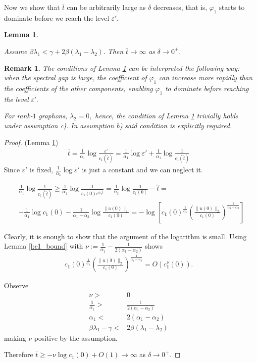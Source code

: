 \documentclass{article}
\newcommand{\1}[1]{{\mathds{1}}_{\left\{#1\right\}}}
\newtheorem{remark}{Remark}
\newtheorem{lemma}{Lemma}
\begin{document}
Now we show that $\bar{t}$ can be arbitrarily large as $\delta$ decreases, that is, $\varphi_1$ starts to dominate before we reach the level $\varepsilon'$.
\begin{lemma}
\label{l:domination_time}

Assume $\beta \lambda_1<\gamma+2\beta(\lambda_1-\lambda_2).$ Then
$ \bar{t} \to \infty $ as $\delta \to 0^{+}.$
\end{lemma}

\begin{remark}
The conditions of Lemma \ref{l:domination_time} can be interpreted the following way: when the spectral gap is large, the coefficient of $\varphi_1$ can increase more rapidly than the coefficients of the other components, enabling
 $\varphi_1$ to dominate before reaching the level $\varepsilon'$.

For rank-$1$ graphons, $\lambda_2=0,$ hence, the condition of Lemma \ref{l:domination_time} trivially holds under assumption c). In assumption b) said condition is explicitly required.
\end{remark}

\begin{proof}(Lemma \ref{l:domination_time})
	\begin{align*}
		\bar{t}=\frac{1}{\alpha_1} \log \frac{\varepsilon'}{c_1(\hat{t})}=\frac{1}{\alpha_1} \log \varepsilon' +\frac{1}{\alpha_1} \log \frac{1}{c_1(\hat{t})}
	\end{align*}
	Since $\varepsilon'$ is fixed, $\frac{1}{\alpha_1} \log \varepsilon'$ is just a constant and we can neglect it.	
	
	\begin{align*}
		&\frac{1}{\alpha_1} \log \frac{1}{c_1(\hat{t})} \geq \frac{1}{\alpha_1} \log \frac{1}{c_1(0)e^{\alpha_1\hat{t}}}=\frac{1}{\alpha_1} \log \frac{1}{c_1(0)}-\hat{t}=\\
		&-\frac{1}{\alpha_1} \log c_1(0)-\frac{1}{\alpha_1-\alpha_2}\log \frac{\| u(0)\|_2}{c_1(0)}=-\log\left[ c_1(0)^{\frac{1}{\alpha_1}} \left(\frac{\|u(0) \|_2}{c_1(0)}\right)^{\frac{1}{\alpha_1-\alpha_2}} \right]
	\end{align*}
	
	Clearly, it is enough to show that the argument of the logarithm is small. Using Lemma \ref{l:c1_bound} with $\nu:=\frac{1}{\alpha_1}-\frac{1}{2(\alpha_1-\alpha_2)}$ shows
	\begin{align*}
		c_1(0)^{\frac{1}{\alpha_1}} \left(\frac{\|u(0) \|_2}{c_1(0)}\right)^{\frac{1}{\alpha_1-\alpha_2}} = O \left( c_1^{\nu}(0) \right).
	\end{align*}
	
	Observe
	\begin{align*}
		\nu >& 0 \\
		\frac{1}{\alpha_1} >& \frac{1}{2(\alpha_1-\alpha_2)} \\
		\alpha_1 <& 2(\alpha_1-\alpha_2) \\
		\beta \lambda_1-\gamma<&2\beta(\lambda_1-\lambda_2) 
	\end{align*}
	making $\nu$ positive by the assumption.
	
	Therefore $\bar{t} \geq -\nu \log c_1(0)+O(1) \to \infty$ as $\delta \to 0^+.$ 
\end{proof}
\end{document}
